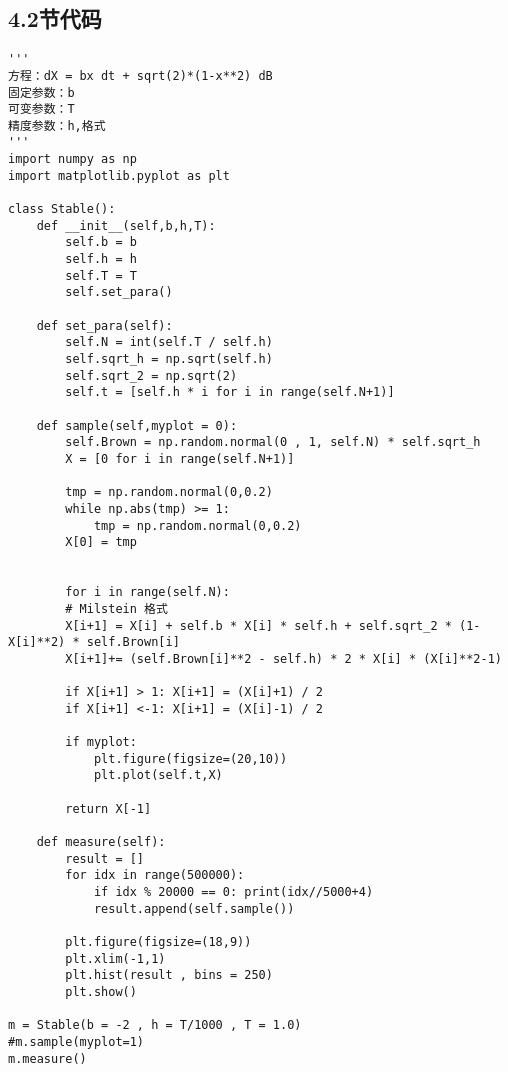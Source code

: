 \subsection*{4.2节代码}
\scriptsize{
\begin{lstlisting}[style=styleP]
'''
方程：dX = bx dt + sqrt(2)*(1-x**2) dB
固定参数：b
可变参数：T
精度参数：h,格式
'''
import numpy as np
import matplotlib.pyplot as plt

class Stable():
	def __init__(self,b,h,T):
		self.b = b
		self.h = h
		self.T = T
		self.set_para()

	def set_para(self):
		self.N = int(self.T / self.h)
		self.sqrt_h = np.sqrt(self.h)
		self.sqrt_2 = np.sqrt(2)
		self.t = [self.h * i for i in range(self.N+1)]

	def sample(self,myplot = 0):
		self.Brown = np.random.normal(0 , 1, self.N) * self.sqrt_h
		X = [0 for i in range(self.N+1)]
		
		tmp = np.random.normal(0,0.2)
		while np.abs(tmp) >= 1:
			tmp = np.random.normal(0,0.2)
		X[0] = tmp        
			
		
		for i in range(self.N):
		# Milstein 格式
		X[i+1] = X[i] + self.b * X[i] * self.h + self.sqrt_2 * (1-X[i]**2) * self.Brown[i]
		X[i+1]+= (self.Brown[i]**2 - self.h) * 2 * X[i] * (X[i]**2-1)
		
		if X[i+1] > 1: X[i+1] = (X[i]+1) / 2
		if X[i+1] <-1: X[i+1] = (X[i]-1) / 2
		
		if myplot:
			plt.figure(figsize=(20,10))
			plt.plot(self.t,X)
		
		return X[-1]

	def measure(self):
		result = []
		for idx in range(500000):
			if idx % 20000 == 0: print(idx//5000+4)
			result.append(self.sample())
			
		plt.figure(figsize=(18,9))
		plt.xlim(-1,1)
		plt.hist(result , bins = 250)
		plt.show()

m = Stable(b = -2 , h = T/1000 , T = 1.0)
#m.sample(myplot=1)
m.measure()
\end{lstlisting}
}






\newpage

